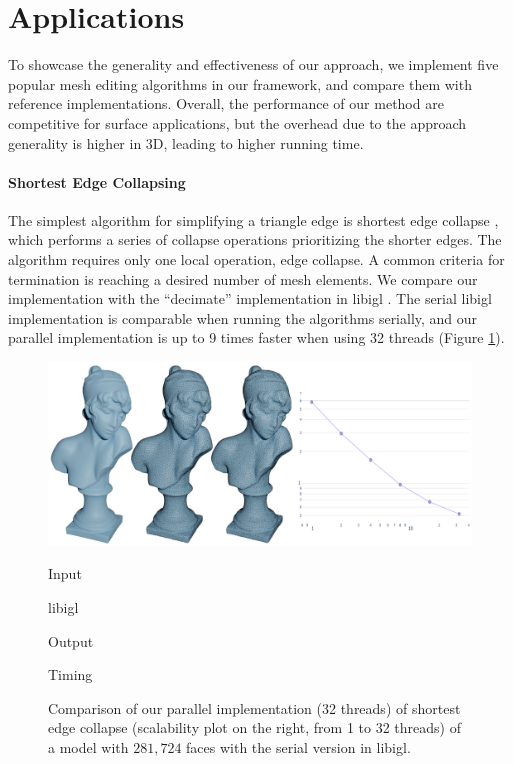 \section{Applications}
\label{sec:applications}

To showcase the generality and effectiveness of our approach, we implement five popular mesh editing algorithms in our framework, and compare them with reference implementations. Overall, the performance of our method are competitive for surface applications, but the overhead due to the approach generality is higher in 3D, leading to higher running time.

\paragraph{Shortest Edge Collapsing}

The simplest algorithm for simplifying a triangle edge is shortest edge collapse \cite{hoppe1996progressive}, which performs a series of collapse operations prioritizing the shorter edges. The algorithm requires only one local operation, edge collapse. A common criteria for termination is reaching a desired number of mesh elements. We compare our implementation with the ``decimate'' implementation in libigl \cite{jacobson2016libigl}. The serial libigl implementation is comparable when running the algorithms serially, and our parallel implementation is up to 9 times faster when using 32 threads (Figure \ref{fig:decimate}).

\begin{figure}
    \centering\footnotesize
    \includegraphics[width=\linewidth]{wmtk-tex/figs/2d-sec-statue.pdf}
    \parbox{.15\linewidth}{\centering Input}\hfill
    \parbox{.15\linewidth}{\centering libigl}
    \hfill
    \parbox{.15\linewidth}{\centering Output}\hfill
    \parbox{.3\linewidth}{\centering Timing}\par
    \caption{
    Comparison of our parallel implementation (32 threads) of shortest edge collapse (scalability plot on the right, from 1 to 32 threads) of a model with $281,724$ faces with the serial version in libigl. }
    
    \label{fig:decimate}
\end{figure}

